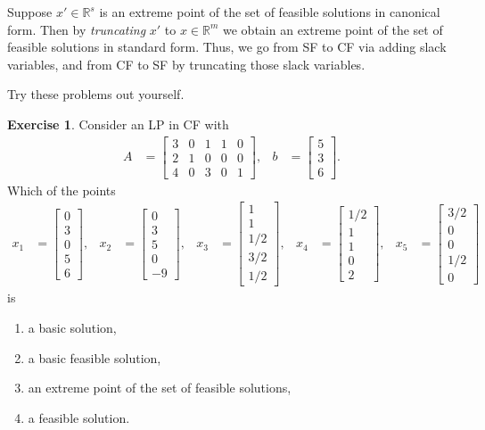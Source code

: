 \documentclass[a4paper, 12pt]{article}
\numberwithin{equation}{section}
\numberwithin{figure}{section}
\theoremstyle{definition}
\newtheorem{exercise}{Exercise}
\newcommand{\R}{\mathbb{R}}
\begin{document}
Suppose $x'\in \R^s$ is an extreme point of the set of feasible solutions in
canonical form. Then by \emph{truncating} $x'$ to $x\in \R^m$ we obtain an
extreme point of the set of feasible solutions in standard form. Thus, we go
from SF to CF via adding slack variables, and from CF to SF by truncating those
slack variables. 

Try these problems out yourself.

\begin{exercise}
	Consider an LP in CF with 
	\begin{align*}
		A &= 
		\begin{bmatrix}
			3 & 0 & 1 & 1 & 0 \\
			2 & 1 & 0 & 0 & 0 \\
			4 & 0 & 3 & 0 & 1 
		\end{bmatrix}, & 
		b &= \begin{bmatrix}
			5 \\ 3\\ 6
		\end{bmatrix}.
	\end{align*}
	Which of the points 
	\begin{align*}
		x_1 &= \begin{bmatrix}
			0 \\ 3 \\ 0 \\ 5 \\ 6 
		\end{bmatrix}, & x_2 &= \begin{bmatrix}
			0 \\ 3 \\ 5 \\ 0 \\ -9 
		\end{bmatrix}, & x_3 &= \begin{bmatrix}
			1 \\ 1 \\ 1/2 \\ 3/2 \\ 1/2
		\end{bmatrix}, & x_4 &= \begin{bmatrix}
			1/2 \\ 1 \\ 1 \\ 0 \\ 2
		\end{bmatrix}, & x_5 &= \begin{bmatrix}
			3/2 \\ 0 \\ 0 \\ 1/2 \\ 0 
		\end{bmatrix}
	\end{align*}
	is 
	\begin{enumerate}[label=$(\roman*)$]
		\item a basic solution,
		\item a basic feasible solution,
		\item an extreme point of the set of feasible solutions,
		\item a feasible solution.
	\end{enumerate}
\end{exercise}
\end{document}
